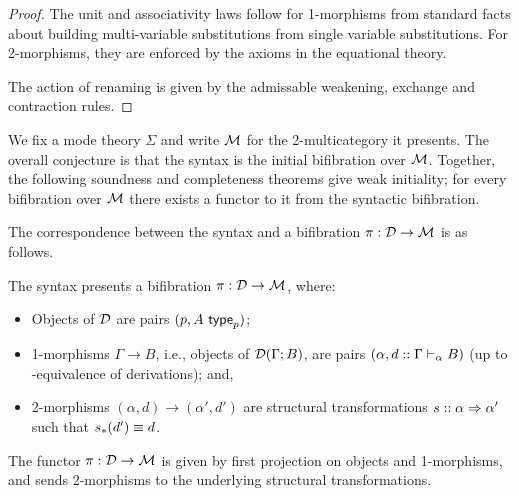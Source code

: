 \begin{proof}
The unit and associativity laws follow for 1-morphisms from standard facts about building multi-variable substitutions from single variable substitutions. For 2-morphisms, they are enforced by the axioms in the equational theory.

The action of renaming is given by the admissable weakening, exchange and contraction rules. 
\end{proof}

We fix a mode theory $\Sigma$ and write $\mathcal{M}$ for the 2-multicategory it presents. The overall conjecture is that the syntax is the initial bifibration
over $\mathcal{M}$.  Together, the following soundness and completeness theorems give weak initiality; for every bifibration over $\mathcal{M}$ there exists a functor to it from the syntactic bifibration.

The correspondence between the syntax and a bifibration $\pi : \mathcal{D} \to \mathcal{M}$ is as follows.

\begin{theorem}
The syntax presents a bifibration $\pi : \mathcal{D} \to \mathcal{M}$, where:
\begin{itemize}
\item Objects of $\mathcal{D}$ are pairs $(p, A \,\, \mathsf{type}_{p})$;
\item 1-morphisms $\Gamma \to B$, i.e., objects of $\mathcal{D}(\Gamma; B)$, are pairs $(\alpha, d :: \Gamma \vdash_{\alpha} B)$ (up to \deq-equivalence of derivations); and,
\item 2-morphisms $(\alpha, d) \to (\alpha', d')$ are structural transformations $s :: \alpha \Rightarrow \alpha'$ such that $s_*(d') \equiv d$.
\end{itemize}
The functor $\pi : \mathcal{D} \to \mathcal{M}$ is given by first projection on objects and 1-morphisms, and sends 2-morphisms to the underlying structural transformations.
\end{theorem}

